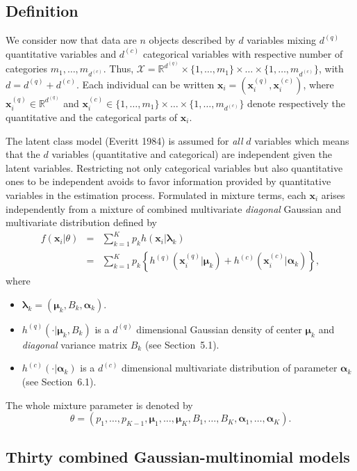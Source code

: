 \documentclass[12pt]{article}
\newcommand{\IR}{\mathbb{R}}
\newcommand{\bx}{\mathbf{x}}
\newcommand{\balpha}{\boldsymbol{\alpha}}
\newcommand{\blambda}{\boldsymbol{\lambda}}
\newcommand{\bmu}{\boldsymbol{\mu}}
\begin{document}
\subsection{Definition}

We consider now that data are $n$ objects described by $d$ variables mixing $d^{(q)}$ quantitative variables and $d^{(c)}$ categorical variables with respective number of categories $m_1,\ldots,m_{d^{(c)}}$. Thus, ${\mathcal X}=\IR^{d^{(q)}}\times\{1,\ldots,m_1\}\times\ldots\times\{1,\ldots,m_{d^{(c)}}\}$, with $d=d^{(q)}+d^{(c)}$. Each individual can be written $\bx_i=(\bx_i^{(q)},\bx_i^{(c)})$, where $\bx_i^{(q)}\in \IR^{d^{(q)}}$ and $\bx_i^{(c)}\in \{1,\ldots,m_1\}\times\ldots\times\{1,\ldots,m_{d^{(c)}}\}$ denote respectively the quantitative and the categorical parts of $\bx_i$.

The latent class model (Everitt 1984) is assumed for {\em all} $d$ variables which means that the $d$ variables (quantitative and categorical) are independent given the latent variables. Restricting not only categorical variables but also quantitative ones to be independent avoids to favor information provided by quantitative variables in the estimation process. Formulated in mixture terms, each $\bx_i$ arises independently from a mixture of combined multivariate {\em diagonal} Gaussian and
multivariate distribution defined by
\begin{eqnarray}
  f(\bx_i|\theta) & = & \sum_{k=1}^K p_k h(\bx_i|\blambda_k) \\
  & = & \sum_{k=1}^K p_k \left\{h^{(q)}(\bx_i^{(q)}|\bmu_k) + h^{(c)}(\bx_i^{(c)}|\balpha_k) \right\},
\end{eqnarray}
where
\begin{itemize}
\item $\blambda_k=(\bmu_k,B_k,\balpha_k)$.
\item $h^{(q)}(\cdot|\bmu_k,B_k)$ is a $d^{(q)}$ dimensional Gaussian density of center $\bmu_k$ and {\em diagonal} variance matrix $B_k$ (see Section~5.1).
\item $h^{(c)}(\cdot|\balpha_k)$ is a $d^{(c)}$ dimensional multivariate distribution of parameter $\balpha_k$ (see Section~6.1).
\end{itemize}
The whole mixture parameter is denoted by
\[
\theta=(p_1,\ldots,p_{K-1},\bmu_1,\ldots,\bmu_K,B_1,\ldots,B_K,\balpha_1,\ldots,\balpha_K).
\]

\subsection{Thirty combined Gaussian-multinomial models}
\end{document}
